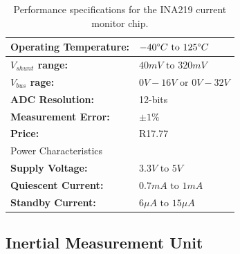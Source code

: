 \begin{table}[H]
	\centering
	\caption{Performance specifications for the INA219 current monitor chip.}
	\begin{tabular}{|l|l|}
		\hline
		\textbf{Operating Temperature: }& $-40\degree C\text{ to } 125\degree C$ \\
		\hline
		\textbf{$V_{shunt}$ range: }& $40mV \text{ to } 320mV$\\ 
		\hline
		\textbf{$V_{bus}$ rage: } & $0V - 16V \text{ or } 0V-32V$\\
		\hline
		\textbf{ADC Resolution: } & 12-bits\\
		\hline
		\textbf{Measurement Error: } &$\pm 1\%$\\ 
		\hline
		\textbf{Price: } & R17.77\footnotemark\\
		\hline
		\multicolumn{2}{l}{Power Characteristics}\\
		\hline
		\textbf{Supply Voltage: } & $3.3V \text{ to } 5V$\\
		\hline
		\textbf{Quiescent Current: } & $0.7mA \text{ to } 1mA$\\
		\hline
		\textbf{Standby Current: } & $6\mu A \text{ to } 15\mu A$\\
		\hline
	\end{tabular}
	
	\label{tab:INA_spec}
\end{table}

\subsection{Inertial Measurement Unit}


